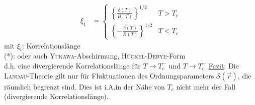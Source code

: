 \begin{enumerate}[A)]
\begin{equation}
\begin{split}
            \xi_1 &= 
            \begin{cases}
                \left\{ \frac{\delta(T)}{B(T)} \right\}^{1/2} & T > T_c \\
                \left\{ - \frac{\delta(T)}{B(T)} \right\}^{1/2} & T < T_c
            \end{cases}
        \end{split}
    \end{equation}
    mit $\xi_i$: Korrelationslänge \\
    (*): oder auch \textsc{Yukawa}-Abschirmung, \textsc{Hückel-Debye}-Form \\
    d.h. eine divergierende Korrelationslänge für $T\to T_c^-$ und $T \to T_c^+$
    \underline{Fazit}: Die \textsc{Landau}-Theorie gilt nur für Fluktuationen des Ordnungsparameters $\mathcal{S}(\vec{r})$, die räumlich begrenzt sind.
    Dies ist i.A.in der Nähe von $T_c$ nicht mehr der Fall (divergierende Korrelationslänge).
\end{enumerate}